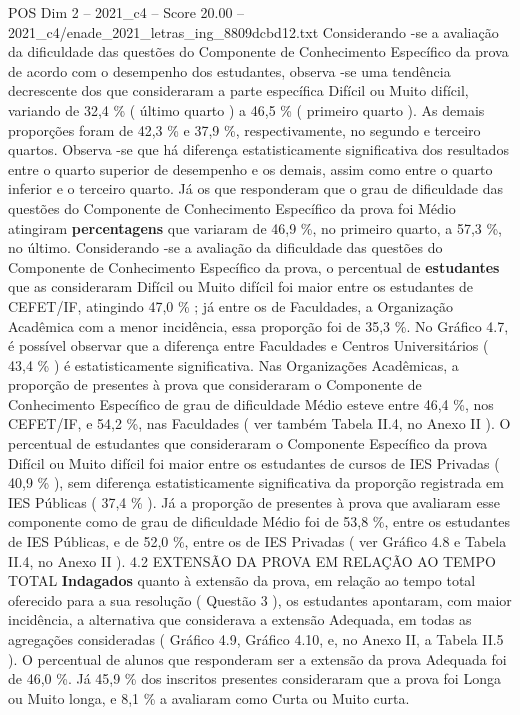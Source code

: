 \begin{textsample}{POS Dim 2 – 2021\_c4 – Score 20.00 – 2021\_c4/enade\_2021\_letras\_ing\_8809dcbd12.txt}
Considerando -se a avaliação da dificuldade das questões do Componente de Conhecimento Específico da prova de acordo com o desempenho dos estudantes, observa -se uma tendência decrescente dos que consideraram a parte específica Difícil ou Muito difícil, variando de 32,4 \% ( último quarto ) a 46,5 \% ( primeiro quarto ).
As demais proporções foram de 42,3 \% e 37,9 \%, respectivamente, no segundo e terceiro quartos.
Observa -se que há diferença estatisticamente significativa dos resultados entre o quarto superior de desempenho e os demais, assim como entre o quarto inferior e o terceiro quarto.
Já os que responderam que o grau de dificuldade das questões do Componente de Conhecimento Específico da prova foi Médio atingiram \textbf{percentagens} que variaram de 46,9 \%, no primeiro quarto, a 57,3 \%, no último.
Considerando -se a avaliação da dificuldade das questões do Componente de Conhecimento Específico da prova, o percentual de \textbf{estudantes} que as consideraram Difícil ou Muito difícil foi maior entre os estudantes de CEFET/IF, atingindo 47,0 \% ; já entre os de Faculdades, a Organização Acadêmica com a menor incidência, essa proporção foi de 35,3 \%.
No Gráfico 4.7, é possível observar que a diferença entre Faculdades e Centros Universitários ( 43,4 \% ) é estatisticamente significativa.
Nas Organizações Acadêmicas, a proporção de presentes à prova que consideraram o Componente de Conhecimento Específico de grau de dificuldade Médio esteve entre 46,4 \%, nos CEFET/IF, e 54,2 \%, nas Faculdades ( ver também Tabela II.4, no Anexo II ).
O percentual de estudantes que consideraram o Componente Específico da prova Difícil ou Muito difícil foi maior entre os estudantes de cursos de IES Privadas ( 40,9 \% ), sem diferença estatisticamente significativa da proporção registrada em IES Públicas ( 37,4 \% ).
Já a proporção de presentes à prova que avaliaram esse componente como de grau de dificuldade Médio foi de 53,8 \%, entre os estudantes de IES Públicas, e de 52,0 \%, entre os de IES Privadas ( ver Gráfico 4.8 e Tabela II.4, no Anexo II ). 4.2 EXTENSÃO DA PROVA EM RELAÇÃO AO TEMPO TOTAL \textbf{Indagados} quanto à extensão da prova, em relação ao tempo total oferecido para a sua resolução ( Questão 3 ), os estudantes apontaram, com maior incidência, a alternativa que considerava a extensão Adequada, em todas as agregações consideradas ( Gráfico 4.9, Gráfico 4.10, e, no Anexo II, a Tabela II.5 ).
O percentual de alunos que responderam ser a extensão da prova Adequada foi de 46,0 \%.
Já 45,9 \% dos inscritos presentes consideraram que a prova foi Longa ou Muito longa, e 8,1 \% a avaliaram como Curta ou Muito curta.

\end{textsample}
